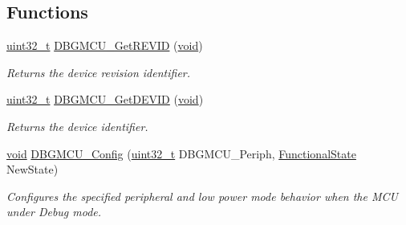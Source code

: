 \subsection*{Functions}
\begin{DoxyCompactItemize}
\item 
\hyperlink{_p_e___types_8h_a33594304e786b158f3fb30289278f5af}{uint32\+\_\+t} \hyperlink{group___d_b_g_m_c_u___private___functions_ga47419e9ca75ab7be4c70feb82faa0511}{D\+B\+G\+M\+C\+U\+\_\+\+Get\+R\+E\+V\+ID} (\hyperlink{usb__devapi_8h_afabf60e7f57651d6d595a02c75f07cd0}{void})
\begin{DoxyCompactList}\small\item\em Returns the device revision identifier. \end{DoxyCompactList}\item 
\hyperlink{_p_e___types_8h_a33594304e786b158f3fb30289278f5af}{uint32\+\_\+t} \hyperlink{group___d_b_g_m_c_u___private___functions_gac34193c34dbce759bf424957a31b3266}{D\+B\+G\+M\+C\+U\+\_\+\+Get\+D\+E\+V\+ID} (\hyperlink{usb__devapi_8h_afabf60e7f57651d6d595a02c75f07cd0}{void})
\begin{DoxyCompactList}\small\item\em Returns the device identifier. \end{DoxyCompactList}\item 
\hyperlink{usb__devapi_8h_afabf60e7f57651d6d595a02c75f07cd0}{void} \hyperlink{group___d_b_g_m_c_u___private___functions_gadf2f267f855ac1e4c03905c5dcfbd28b}{D\+B\+G\+M\+C\+U\+\_\+\+Config} (\hyperlink{_p_e___types_8h_a33594304e786b158f3fb30289278f5af}{uint32\+\_\+t} D\+B\+G\+M\+C\+U\+\_\+\+Periph, \hyperlink{agilefox_2library_2inc_2stm32f10x__type_8h_ac9a7e9a35d2513ec15c3b537aaa4fba1}{Functional\+State} New\+State)
\begin{DoxyCompactList}\small\item\em Configures the specified peripheral and low power mode behavior when the M\+CU under Debug mode. \end{DoxyCompactList}\end{DoxyCompactItemize}
